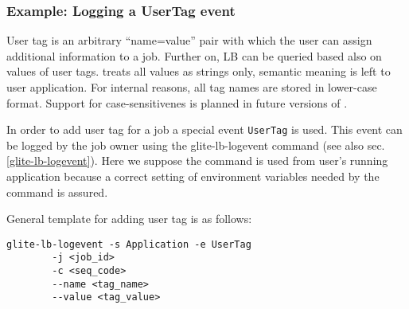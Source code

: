%
%
%
%
\subsubsection{Example: Logging a UserTag event}
\label{e:usertag}

User tag is an arbitrary ``name=value'' pair with which the user can assign
additional information to a job. Further on, LB can be queried based also on
values of user tags. \LB treats all values as strings only, semantic meaning
is left to user application. For internal reasons, all tag names are stored 
in lower-case format. Support for case-sensitivenes is planned in future 
versions of \LB.

In order to add user tag for a job a special event \verb'UserTag' is used. This
event can be logged by the job owner using the glite-lb-logevent command (see
also sec.\ref{glite-lb-logevent}). Here we suppose the command is used from
user's running application because a correct setting of environment variables
needed by the command is assured.

General template for adding user tag is as follows:

\begin{verbatim}
glite-lb-logevent -s Application -e UserTag    
        -j <job_id>                         
        -c <seq_code>                       
        --name <tag_name>                   
        --value <tag_value>
\end{verbatim}


